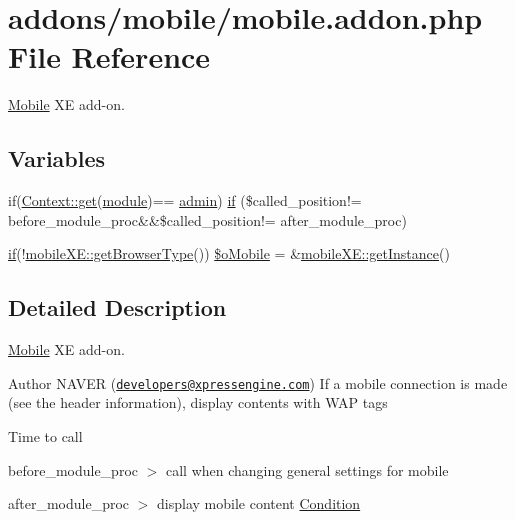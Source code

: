\hypertarget{mobile_8addon_8php}{}\section{addons/mobile/mobile.addon.\+php File Reference}
\label{mobile_8addon_8php}


\hyperlink{classMobile}{Mobile} X\+E add-\/on.  


\subsection*{Variables}
\begin{DoxyCompactItemize}
\item 
if(\hyperlink{classContext_a90ce25d65fe6c9778421cbb36ab3def5}{Context\+::get}(\textquotesingle{}\hyperlink{classmodule}{module}\textquotesingle{})== \textquotesingle{}\hyperlink{classadmin}{admin}\textquotesingle{}) \hyperlink{mobile_8addon_8php_a13d720e0d3597438cb76873850ce4b63}{if} (\$called\+\_\+position!= \textquotesingle{}before\+\_\+module\+\_\+proc\textquotesingle{}\&\&\$called\+\_\+position!= \textquotesingle{}after\+\_\+module\+\_\+proc\textquotesingle{})
\item 
\hyperlink{point__level__icon_8addon_8php_a29031816e50a8f742422e671b2bef9b2}{if}(!\hyperlink{classmobileXE_a462a4900af63aa2bfbcea2168afbe876}{mobile\+X\+E\+::get\+Browser\+Type}()) \hyperlink{mobile_8addon_8php_a2e1472c6f1bb5b341e95a632164904d0}{\$o\+Mobile} = \&\hyperlink{classmobileXE_a11db662f7f05a929e2559ee6d42fca2c}{mobile\+X\+E\+::get\+Instance}()
\end{DoxyCompactItemize}


\subsection{Detailed Description}
\hyperlink{classMobile}{Mobile} X\+E add-\/on. 

\begin{DoxyAuthor}{Author}
N\+A\+V\+E\+R (\href{mailto:developers@xpressengine.com}{\tt developers@xpressengine.\+com}) If a mobile connection is made (see the header information), display contents with W\+A\+P tags
\end{DoxyAuthor}
Time to call

before\+\_\+module\+\_\+proc $>$ call when changing general settings for mobile

after\+\_\+module\+\_\+proc $>$ display mobile content \hyperlink{classCondition}{Condition} 

